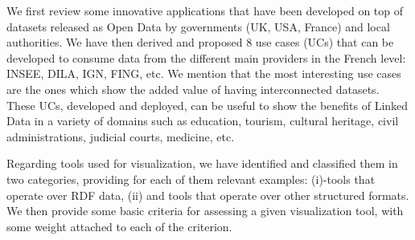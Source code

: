 We first review some innovative applications that have been developed on top of datasets released as Open Data by governments (UK, USA, France) and local authorities. We have then derived and proposed 8 use cases (UCs) that can be developed to consume data from the different main providers in the French level: INSEE, DILA, IGN, FING, etc. We mention that the most interesting use cases are the ones which show the added value of having interconnected datasets. These UCs,  developed and deployed, can be useful to show the benefits of Linked Data in a variety of domains such as education, tourism, cultural heritage, civil administrations, judicial courts, medicine, etc.

Regarding tools used for visualization, we have identified and classified them in two categories, providing for each of them relevant examples: (i)-tools that operate over RDF data, (ii) and tools that operate over other structured formats. We then provide some basic criteria for assessing a given visualization tool, with some weight attached to each of the criterion.

